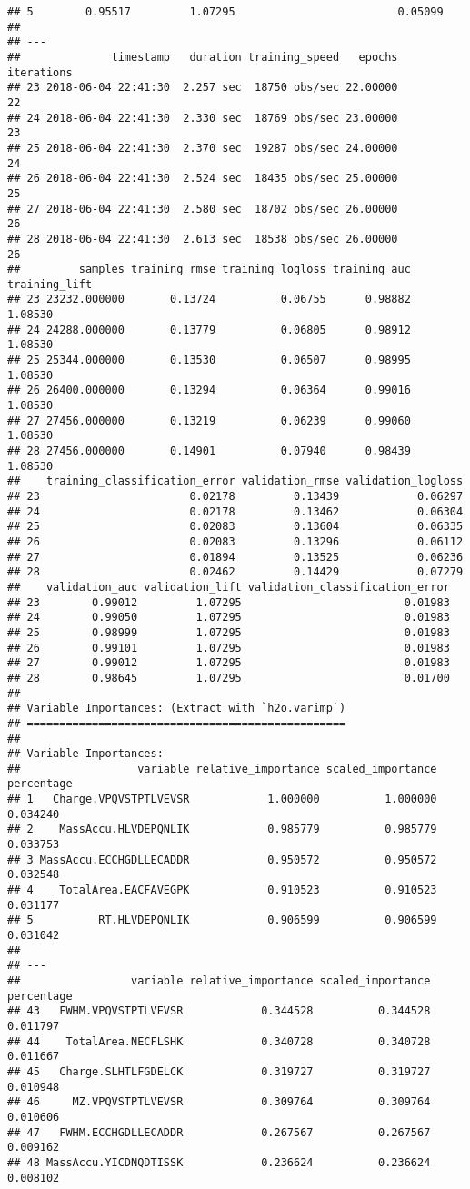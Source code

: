 \documentclass[]{article}
\begin{document}
\begin{verbatim}
## 5        0.95517         1.07295                         0.05099
## 
## ---
##              timestamp   duration training_speed   epochs iterations
## 23 2018-06-04 22:41:30  2.257 sec  18750 obs/sec 22.00000         22
## 24 2018-06-04 22:41:30  2.330 sec  18769 obs/sec 23.00000         23
## 25 2018-06-04 22:41:30  2.370 sec  19287 obs/sec 24.00000         24
## 26 2018-06-04 22:41:30  2.524 sec  18435 obs/sec 25.00000         25
## 27 2018-06-04 22:41:30  2.580 sec  18702 obs/sec 26.00000         26
## 28 2018-06-04 22:41:30  2.613 sec  18538 obs/sec 26.00000         26
##         samples training_rmse training_logloss training_auc training_lift
## 23 23232.000000       0.13724          0.06755      0.98882       1.08530
## 24 24288.000000       0.13779          0.06805      0.98912       1.08530
## 25 25344.000000       0.13530          0.06507      0.98995       1.08530
## 26 26400.000000       0.13294          0.06364      0.99016       1.08530
## 27 27456.000000       0.13219          0.06239      0.99060       1.08530
## 28 27456.000000       0.14901          0.07940      0.98439       1.08530
##    training_classification_error validation_rmse validation_logloss
## 23                       0.02178         0.13439            0.06297
## 24                       0.02178         0.13462            0.06304
## 25                       0.02083         0.13604            0.06335
## 26                       0.02083         0.13296            0.06112
## 27                       0.01894         0.13525            0.06236
## 28                       0.02462         0.14429            0.07279
##    validation_auc validation_lift validation_classification_error
## 23        0.99012         1.07295                         0.01983
## 24        0.99050         1.07295                         0.01983
## 25        0.98999         1.07295                         0.01983
## 26        0.99101         1.07295                         0.01983
## 27        0.99012         1.07295                         0.01983
## 28        0.98645         1.07295                         0.01700
## 
## Variable Importances: (Extract with `h2o.varimp`) 
## =================================================
## 
## Variable Importances: 
##                  variable relative_importance scaled_importance percentage
## 1   Charge.VPQVSTPTLVEVSR            1.000000          1.000000   0.034240
## 2    MassAccu.HLVDEPQNLIK            0.985779          0.985779   0.033753
## 3 MassAccu.ECCHGDLLECADDR            0.950572          0.950572   0.032548
## 4    TotalArea.EACFAVEGPK            0.910523          0.910523   0.031177
## 5          RT.HLVDEPQNLIK            0.906599          0.906599   0.031042
## 
## ---
##                 variable relative_importance scaled_importance percentage
## 43   FWHM.VPQVSTPTLVEVSR            0.344528          0.344528   0.011797
## 44    TotalArea.NECFLSHK            0.340728          0.340728   0.011667
## 45   Charge.SLHTLFGDELCK            0.319727          0.319727   0.010948
## 46     MZ.VPQVSTPTLVEVSR            0.309764          0.309764   0.010606
## 47   FWHM.ECCHGDLLECADDR            0.267567          0.267567   0.009162
## 48 MassAccu.YICDNQDTISSK            0.236624          0.236624   0.008102
\end{verbatim}
\end{document}
